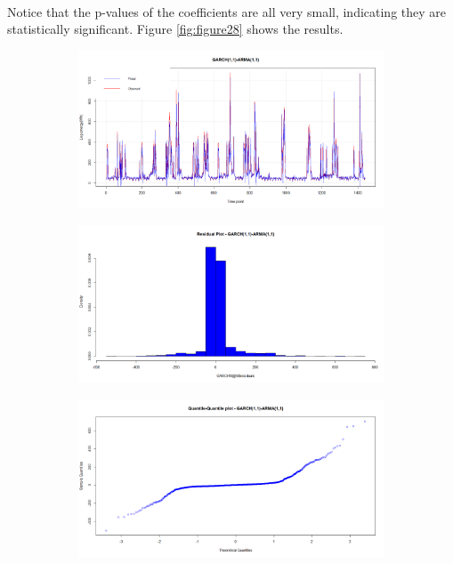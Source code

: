\documentclass[12pt]{article}
\begin{document}
\paragraph{}
Notice that the p-values of the coefficients are all very small, indicating they are statistically significant. Figure \ref{fig:figure28} shows the results.
\begin{figure}[H]
  \centering
  \begin{subfigure}[b]{0.49\linewidth}
    \includegraphics[width=\linewidth]{figure27-1.png}
  \end{subfigure}
  \begin{subfigure}[b]{0.49\linewidth}
    \includegraphics[width=\linewidth]{figure27-2.png}
  \end{subfigure}
  \begin{subfigure}[b]{0.49\linewidth}
    \includegraphics[width=\linewidth]{figure27-3.png}

\end{subfigure}
\end{figure}
\end{document}
